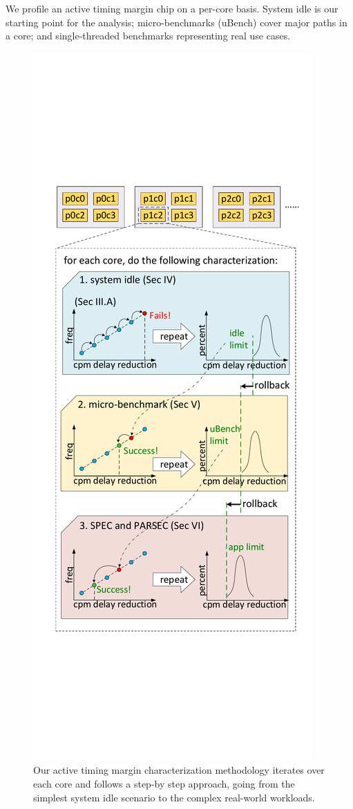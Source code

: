 We profile an active timing margin chip on a per-core basis. System idle is our starting point for the analysis; micro-benchmarks (uBench) cover major paths in a core; and single-threaded benchmarks representing real use cases.

\begin{figure}[H]
  \centering
  \includegraphics[trim=10 280 10 280,clip,width=.8\linewidth]{graphs/process//profile-flow/profile-flow.pdf}
  \caption{Our active timing margin characterization methodology iterates over each core and follows a step-by step approach, going from the simplest system idle scenario to the complex real-world workloads.}
  \label{fig:methodology}
\end{figure}

